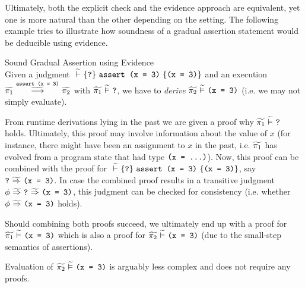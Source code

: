 Ultimately, both the explicit check and the evidence approach are equivalent, yet one is more natural than the other depending on the setting.
The following example tries to illustrate how soundness of a gradual assertion statement would be deducible using evidence.
\begin{example}{Sound Gradual Assertion using Evidence}\label{ex:snd-evidence}~\\
    Given a judgment $\gthoare{}{\qm}{\sAssert{\phiEq{x}{3}}}{\phiEq{x}{3}}$ and an execution $\gsstepConsume{\sAssert{\phiEq{x}{3}}}{\grad{\pi_1}}{\grad{\pi_2}}$ with $\evalgphiGen{\grad{\pi_1}}{\qm}$, we have to \emph{derive} $\evalgphiGen{\grad{\pi_2}}{\phiEq{x}{3}}$ (i.e. we may not simply evaluate).
    
    From runtime derivations lying in the past we are given a proof why $\evalgphiGen{\grad{\pi_1}}{\qm}$ holds.
    Ultimately, this proof may involve information about the value of $x$ (for instance, there might have been an assignment to $x$ in the past, i.e. $\grad{\pi_1}$ has evolved from a program state that had type $\phiEq{x}{...}$).
    Now, this proof can be combined with the proof for $\gthoare{}{\qm}{\sAssert{\phiEq{x}{3}}}{\phiEq{x}{3}}$, say $\gphiImplies{\qm}{\phiEq{x}{3}}$.
    In case the combined proof results in a transitive judgment $\gphiImplies{\phi}{\gphiImplies{\qm}{\phiEq{x}{3}}}$, this judgment can be checked for consistency (i.e. whether $\gphiImplies{\phi}{\phiEq{x}{3}}$ holds).
    
    Should combining both proofs succeed, we ultimately end up with a proof for $\evalgphiGen{\grad{\pi_1}}{\phiEq{x}{3}}$ which is also a proof for $\evalgphiGen{\grad{\pi_2}}{\phiEq{x}{3}}$ (due to the small-step semantics of assertions).
    
    Evaluation of $\evalgphiGen{\grad{\pi_2}}{\phiEq{x}{3}}$ is arguably less complex and does not require any proofs.
    \begin{comment}
    Note also that the assertion example above is a very simple case. In general, it might be required to show consistency of more complex proofs, e.g. by proving that $$\gphiImplies{\phiAnd{$(\phiAnd{$(\wo{\phi}{\eresult})$}{\phiEq{\eresult}{\ethis}})[\ttt{x},\ttt{y}/\eresult,\ethis]$}{\phiEq{x}{p}}}{\phiEq{y}{p}}$$
    holds given $$\gphiImplies{\phiAnd{$(\phiAnd{$(\wo{\phi}{\eresult})$}{\phiEq{\eresult}{\ethis}})[\ttt{x},\ttt{y}/\eresult,\ethis]$}{\phiEq{x}{p}}}{\phiEq{y}{p}}$$
    , which requires evidence sophisticated enough to model the program environment.
    \end{comment}
\end{example}

